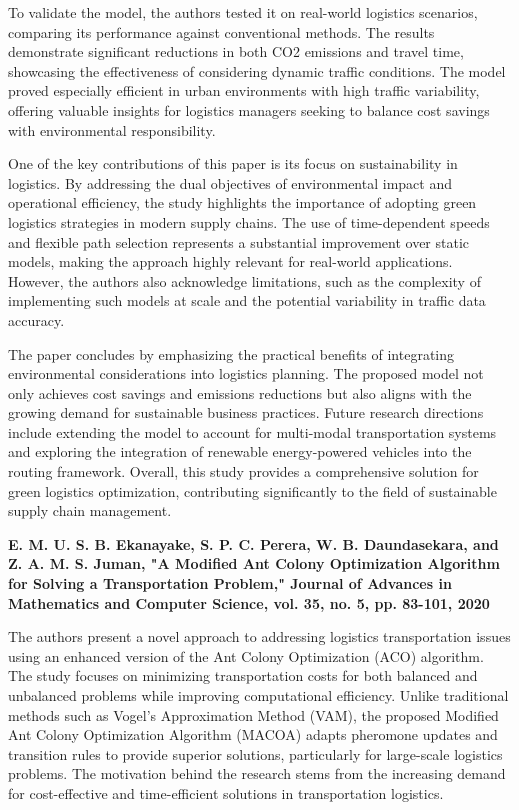 To validate the model, the authors tested it on real-world logistics scenarios, comparing its performance against conventional methods. The results demonstrate significant reductions in both CO2 emissions and travel time, showcasing the effectiveness of considering dynamic traffic conditions. The model proved especially efficient in urban environments with high traffic variability, offering valuable insights for logistics managers seeking to balance cost savings with environmental responsibility.

One of the key contributions of this paper is its focus on sustainability in logistics. By addressing the dual objectives of environmental impact and operational efficiency, the study highlights the importance of adopting green logistics strategies in modern supply chains. The use of time-dependent speeds and flexible path selection represents a substantial improvement over static models, making the approach highly relevant for real-world applications. However, the authors also acknowledge limitations, such as the complexity of implementing such models at scale and the potential variability in traffic data accuracy.

The paper concludes by emphasizing the practical benefits of integrating environmental considerations into logistics planning. The proposed model not only achieves cost savings and emissions reductions but also aligns with the growing demand for sustainable business practices. Future research directions include extending the model to account for multi-modal transportation systems and exploring the integration of renewable energy-powered vehicles into the routing framework. Overall, this study provides a comprehensive solution for green logistics optimization, contributing significantly to the field of sustainable supply chain management.

\textbf{\cite{ekanayake2020antcolony}E. M. U. S. B. Ekanayake, S. P. C. Perera, W. B. Daundasekara, and Z. A. M. S. Juman, "A Modified Ant Colony Optimization Algorithm for Solving a Transportation Problem," Journal of Advances in Mathematics and Computer Science, vol. 35, no. 5, pp. 83-101, 2020}

The authors present a novel approach to addressing logistics transportation issues using an enhanced version of the Ant Colony Optimization (ACO) algorithm. The study focuses on minimizing transportation costs for both balanced and unbalanced problems while improving computational efficiency. Unlike traditional methods such as Vogel’s Approximation Method (VAM), the proposed Modified Ant Colony Optimization Algorithm (MACOA) adapts pheromone updates and transition rules to provide superior solutions, particularly for large-scale logistics problems. The motivation behind the research stems from the increasing demand for cost-effective and time-efficient solutions in transportation logistics.

